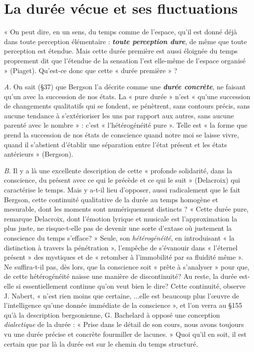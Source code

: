 \section{La durée vécue et ses fluctuations}%
« On peut dire,
en un sens, du temps comme de l’espace, qu’il est donné déjà dans
toute perception élémentaire : \textbf{\textit {toute perception dure}}, de même
que toute perception est étendue. Mais cette durée première est aussi
éloignée du temps proprement dit que l’étendue de la sensation l’est
elle-même de l’espace organisé » (Piaget). Qu’est-ce donc que cette
« durée première » ?

{\it A.} On sait (\S 37) que Bergson l’a décrite comme une \textbf{\textit {durée
concrète}}, ne faisant qu’un avec la succession de nos états. La « pure
durée » n’est « qu’une succession de changements qualitatifs qui se
fondent, se pénètrent, sans contours précis, sans aucune tendance à
s’extérioriser les uns par rapport aux autres, sans aucune parenté avec
le nombre » : c’est « l’hétérogénéité pure ». Telle est « la forme que
prend la succession de nos états de conscience quand notre moi se
laisse vivre, quand il s’abstient d'établir une séparation entre l’état
présent et les états antérieurs » (Bergson).

{\it B.} Il y a là une excellente description de cette « profonde solidarité,
dans la conscience, du présent avec ce qui le précède et ce qui le suit »
(Delacroix) qui caractérise le temps. Mais y a-t-il lieu d'opposer,
aussi radicalement que le fait Bergson, cette continuité qualitative
de la durée au temps homogène et mesurable, dont les moments
sont numériquement distincts ? « Cette durée pure, remarque Delacroix,
dont l’émotion lyrique et musicale est l’approximation la
plus juste, ne risque-t-elle pas de devenir une sorte d’extase où justement
la conscience du temps s’efface? » Seule, son {\it hétérogénéité}, en
introduisant « la distinction à travers la pénétration », l'empêche de
s’évanouir dans « l’éternel présent » des mystiques et de « retomber
à l’immobilité par sa fluidité même ». Ne suffira-t-il pas, dès lors,
que la conscience soit « prête à s’analyser » pour que, de cette hétérogénéité
naisse une manière de discontinuité? Au reste, la durée est-elle
si essentiellement continue qu’on veut bien le dire? Cette continuité,
observe J. Nabert, « n’est rien moins que certaine, ...elle est
beaucoup plus l’œuvre de l'intelligence qu’une donnée immédiate de
la conscience », et l’on verra au \S 155 qu’à la description bergsonienne,
G. Bachelard à opposé une conception {\it dialectique} de la durée :
« Prise dans le détail de son cours, nous avons toujours vu une durée
précise et concrète fourmiller de lacunes. » Quoi qu’il en soit, il est
certain que par là la durée est sur le chemin du temps structuré.

